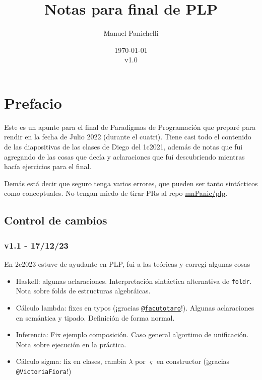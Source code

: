 \documentclass{report}
\author{Manuel Panichelli}
\title{Notas para final de PLP}
\date{\today\\v1.0}
\theoremstyle{definition} %
\begin{document}
\maketitle

\tableofcontents

\chapter*{Prefacio}

Este es un apunte para el final de Paradigmas de Programación que preparé para
rendir en la fecha de Julio 2022 (durante el cuatri). Tiene casi todo el
contenido de las diapositivas de las clases de Diego del 1c2021, además de notas
que fui agregando de las cosas que decía y aclaraciones que fuí descubriendo
mientras hacía ejercicios para el final.

Demás está decir que seguro tenga varios errores, que pueden ser tanto
sintácticos como conceptuales. No tengan miedo de tirar PRs al repo \href{https://github.com/mnPanic/plp}{mnPanic/plp}.

\section*{Control de cambios}

\subsection*{v1.1 - 17/12/23}

En 2c2023 estuve de ayudante en PLP, fui a las teóricas y corregí algunas cosas 

\begin{itemize}
    \item Haskell: algunas aclaraciones. Interpretación sintáctica alternativa
    de \texttt{foldr}. Nota sobre folds de estructuras algebráicas.
    \item Cálculo lambda: fixes en typos (¡gracias
    \href{https://github.com/facutotaro}{\texttt{@facutotaro}}!). Algunas
    aclaraciones en semántica y tipado. Definición de forma normal.
    \item Inferencia: Fix ejemplo composición. Caso general algortimo de
    unificación. Nota sobre ejecución en la práctica.
    \item Cálculo sigma: fix en clases, cambia $\lambda$ por $\varsigma$ en constructor (¡gracias \texttt{@VictoriaFiora}!)
\end{itemize}
\end{document}
